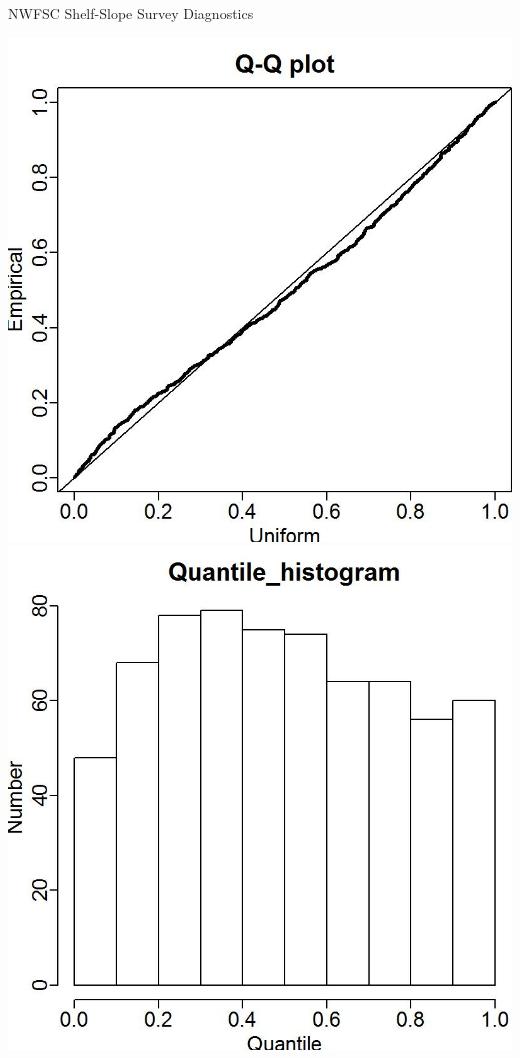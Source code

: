 \documentclass[pdf]{beamer}\usepackage[]{graphicx}\usepackage[]{color}
\begin{document}
\begin{frame}{NWFSC Shelf-Slope Survey Diagnostics}
  \begin{center}
  \includegraphics[scale = 0.50]{figures/Combo_Q-Q_plot.jpg}
  \includegraphics[scale = 0.50]{figures/Combo_Q-Q_hist.jpg}
  \end{center}
\end{frame}
\end{document}
